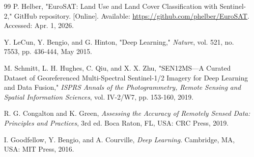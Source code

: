 ﻿\documentclass[conference]{IEEEtran}
\begin{document}
\begin{thebibliography}{99}
P. Helber, "EuroSAT: Land Use and Land Cover Classification with Sentinel-2," GitHub repository. [Online]. Available: \url{https://github.com/phelber/EuroSAT}. Accessed: Apr. 1, 2026.

Y. LeCun, Y. Bengio, and G. Hinton, "Deep Learning," \emph{Nature}, vol. 521, no. 7553, pp. 436-444, May 2015.

M. Schmitt, L. H. Hughes, C. Qiu, and X. X. Zhu, "SEN12MS---A Curated Dataset of Georeferenced Multi-Spectral Sentinel-1/2 Imagery for Deep Learning and Data Fusion," \emph{ISPRS Annals of the Photogrammetry, Remote Sensing and Spatial Information Sciences}, vol. IV-2/W7, pp. 153-160, 2019.

R. G. Congalton and K. Green, \emph{Assessing the Accuracy of Remotely Sensed Data: Principles and Practices}, 3rd ed. Boca Raton, FL, USA: CRC Press, 2019.

I. Goodfellow, Y. Bengio, and A. Courville, \emph{Deep Learning}. Cambridge, MA, USA: MIT Press, 2016.

\end{thebibliography}
\end{document}
